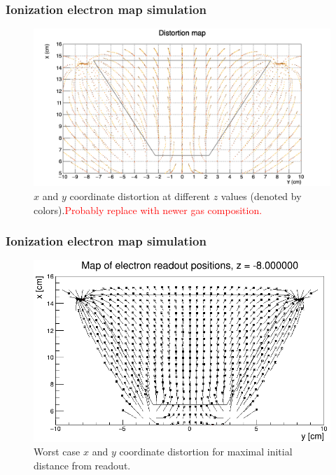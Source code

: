 \documentclass{beamer}
\begin{document}
	\begin{frame}
		\frametitle{Ionization electron map simulation}
		\begin{figure}
			\centering
			\includegraphics[height=0.68\textheight]{../images/map_dist.png}\\
			\small{$x$ and $y$ coordinate distortion at different $z$ values (denoted by colors).\textcolor{red}{Probably replace with newer gas composition.}}
		\end{figure}
	\end{frame}
	\begin{frame}
		\frametitle{Ionization electron map simulation}
		\centering
		\begin{minipage}[c]{0.9\textwidth}
			\begin{figure}
				\centering
				\includegraphics[height=0.7\textheight]{../images/map_dist2_new.png}\\
				\small{Worst case $x$ and $y$ coordinate distortion for maximal initial distance from readout.}
			\end{figure}
		\end{minipage}
	\end{frame}
\end{document}
